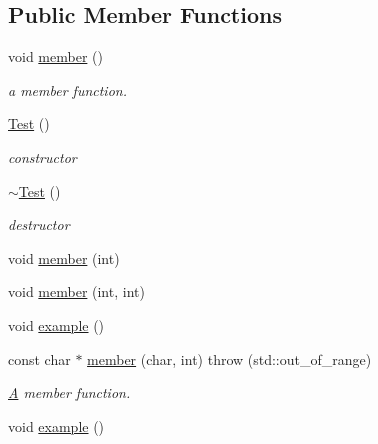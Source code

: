 \subsection*{Public Member Functions}
\begin{DoxyCompactItemize}
\item 
\hypertarget{classTest_a703997077e40c222687a0ea2973a9ea1}{void \hyperlink{classTest_a703997077e40c222687a0ea2973a9ea1}{member} ()}\label{classTest_a703997077e40c222687a0ea2973a9ea1}

\begin{DoxyCompactList}\small\item\em a member function. \end{DoxyCompactList}\item 
\hyperlink{classTest_a44e3a28c552193de099601e2910531f1}{Test} ()
\begin{DoxyCompactList}\small\item\em constructor \end{DoxyCompactList}\item 
\hyperlink{classTest_a31b169208ad4fc5344a7b6b8e1fd00c1}{$\sim$\-Test} ()
\begin{DoxyCompactList}\small\item\em destructor \end{DoxyCompactList}\item 
void \hyperlink{classTest_ac2f90eeb597ab8382dcdfcdf1df720f1}{member} (int)
\item 
void \hyperlink{classTest_aea163a1016f022bdb9e4acc3a32fa3eb}{member} (int, int)
\item 
void \hyperlink{classTest_a219565a812ad07b6517d74bdb36711ea}{example} ()
\item 
const char $\ast$ \hyperlink{classTest_a8a2453fcd30504975daa648a70a4e99e}{member} (char, int)  throw (std\-::out\-\_\-of\-\_\-range)
\begin{DoxyCompactList}\small\item\em \hyperlink{classA}{A} member function. \end{DoxyCompactList}\item 
\hypertarget{classTest_a219565a812ad07b6517d74bdb36711ea}{void \hyperlink{classTest_a219565a812ad07b6517d74bdb36711ea}{example} ()}\label{classTest_a219565a812ad07b6517d74bdb36711ea}


\end{DoxyCompactItemize}
